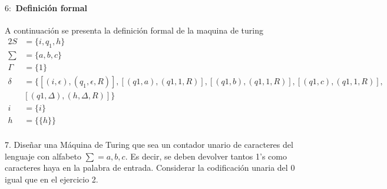 \documentclass[10pt,a4paper]{book}
\begin{document}
{\begin{figure*}[ht!]
\end{figure*}
\paragraph{$6:$ Definición formal}A continuación se presenta la definición formal de la maquina de turing\\[0.2cm]
\begin{alignat*}{2}
	S&= \{i, q_1,h\}\\
	\textstyle \sum&= \{a,b,c\}\\
	\Gamma&=\{1\}\\
	\delta&=\{[(i,\epsilon), (q_1,\epsilon,R)], [(q1,a), (q1,1,R)], [(q1,b), (q1,1,R)], [(q1,c), (q1,1,R)],\\& [(q1,\Delta), (h,\Delta,R)]\}\\
	i&=\{i\}\\
	h&=\{\{h\}\}
\end{alignat*}
\newpage
\paragraph{}7. Diseñar una Máquina de Turing que sea un contador unario de caracteres del lenguaje con alfabeto $\sum = {a,b,c}$. Es decir, se deben devolver tantos 1’s como caracteres haya en la palabra de entrada. Considerar la codificación unaria del 0 igual que en el ejercicio 2.\\[1cm]
\begin{figure*}[ht!]
	\centering
\end{figure*}

}
\end{document}
